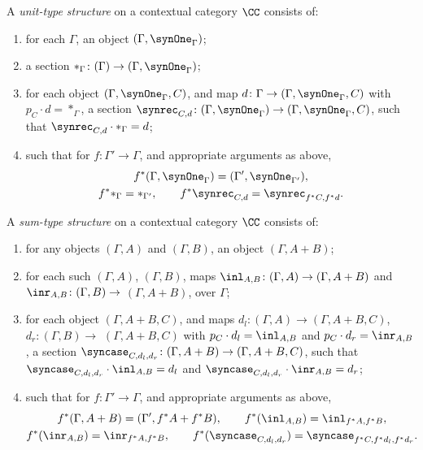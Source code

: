 \begin{definition}
A \emph{unit-type structure} on a contextual category $\CC$ consists of:
\begin{enumerate}
  \item for each $\Gamma$, an object $(\Gamma,\synOne_\Gamma)$;
  \item a section $\ast_{\Gamma} \colon (\Gamma) \to (\Gamma,\synOne_\Gamma)$;
  \item for each object $(\Gamma,\synOne_\Gamma, C)$, and map $d \colon \Gamma \to (\Gamma,\synOne_\Gamma, C)$ with $p_C \cdot d = \ast_{\Gamma}$, a section $\synrec_{C,d} \colon (\Gamma,\synOne_\Gamma) \to (\Gamma,\synOne_\Gamma, C)$, such that $\synrec_{C,d} \cdot \ast_{\Gamma} = d$;
  \item such that for $f \colon \Gamma' \to \Gamma$, and appropriate arguments as above,
   \begin{gather*}
     f^*(\Gamma, \synOne_\Gamma) = (\Gamma', \synOne_{\Gamma'}), \\
     f^*\ast_{\Gamma} = \ast_{\Gamma'}, \qquad f^*\synrec_{C,d} = \synrec_{f^*C,f^*d}.
   \end{gather*} 
 \end{enumerate}
\end{definition}

\begin{definition}
A \emph{sum-type structure} on a contextual category $\CC$ consists of:
\begin{enumerate}
  \item for any objects $(\Gamma,A)$ and $(\Gamma,B)$, an object $(\Gamma,A+B)$;
  \item for each such $(\Gamma,A)$, $(\Gamma,B)$, maps $\inl_{A,B} \colon (\Gamma,A) \to (\Gamma,A+B)$ and $\inr_{A,B} \colon (\Gamma,B) \to$ $(\Gamma,A+B)$, over $\Gamma$;
  \item for each object $(\Gamma,A+B, C)$, and maps $d_l \colon (\Gamma,A) \to (\Gamma,A+B, C)$, $d_r \colon (\Gamma,B) \to$ $(\Gamma,A+B, C)$ with $p_C \cdot d_l = \inl_{A,B}$ and $p_C \cdot d_r = \inr_{A,B}$, a section $\syncase_{C,d_l,d_r} \colon (\Gamma,A+B) \to (\Gamma,A+B,C)$, such that $\syncase_{C,d_l,d_r} \cdot \inl_{A,B} = d_l$ and $\syncase_{C,d_l,d_r} \cdot \inr_{A,B} = d_r$;
  \item such that for $f \colon \Gamma' \to \Gamma$, and appropriate arguments as above,
   \begin{gather*}
     f^*(\Gamma,A+B) = (\Gamma', f^*A + f^*B), \qquad f^*(\inl_{A,B}) = \inl_{f^*A,f^*B}, \\
     f^*(\inr_{A,B}) = \inr_{f^*A,f^*B}, \qquad f^*(\syncase_{C,d_l,d_r}) = \syncase_{f^*C,f^*d_l,f^*d_r}.
   \end{gather*} 
 \end{enumerate}
\end{definition}

